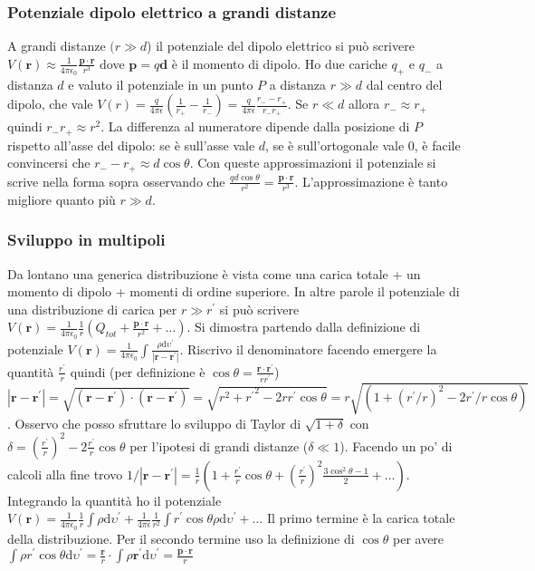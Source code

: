 \documentclass[11pt,a4paper]{article}
\newcommand{\de}{\mathrm d}
\begin{document}
\subsubsection{Potenziale dipolo elettrico a grandi distanze}
A grandi distanze $(r \gg d$) il potenziale del dipolo elettrico si può scrivere $V(\mathbf r) \approx \frac1{4\pi\epsilon_0} \frac{\mathbf p \cdot \mathbf r}{r^3}$ dove $\mathbf p = q \mathbf d$ è il momento di dipolo. Ho due cariche $q_+$ e $q_-$ a distanza $d$ e valuto il potenziale in un punto $P$ a distanza $r\gg d$ dal centro del dipolo, che vale $V(r)=\frac{q}{4\pi\epsilon} (\frac1{r_+}-\frac1{r_-}) = \frac{q}{4\pi\epsilon} \frac{r_- - r_+}{r_- r_+}$. Se $r \ll d$ allora $r_- \approx r_+$ quindi $r_- r_+ \approx r^2$. La differenza al numeratore dipende dalla posizione di $P$ rispetto all'asse del dipolo: se è sull'asse vale $d$, se è sull'ortogonale vale $0$, è facile convincersi che $r_- - r_+ \approx d \cos\theta$. Con queste approssimazioni il potenziale si scrive nella forma sopra osservando che $\frac{q d \cos\theta}{r^2} = \frac{\mathbf p \cdot \mathbf r}{r^3}$. L'approssimazione è tanto migliore quanto più $r\gg d$.

\subsubsection{Sviluppo in multipoli}
Da lontano una generica distribuzione è vista come una carica totale + un momento di dipolo + momenti di ordine superiore. In altre parole il potenziale di una distribuzione di carica per $r \gg r^\prime$ si può scrivere $V(\mathbf r) = \frac1{4\pi\epsilon_0} \frac 1r (Q_{tot} + \frac{\mathbf  p \cdot \mathbf  r}{r^2} + \ldots)$. Si dimostra partendo dalla definizione di potenziale $V(\mathbf r) = \frac1{4\pi\epsilon_0} \int \frac{\rho \de\upsilon^\prime}{|\mathbf r - \mathbf r^\prime|}$. Riscrivo il denominatore facendo emergere la quantità $\frac {r^\prime}r$ quindi (per definizione è $\cos\theta = \frac{\mathbf r \cdot \mathbf r^\prime}{r r^\prime}$) $|\mathbf r - \mathbf r^\prime| = \sqrt{(\mathbf r - \mathbf r^\prime)\cdot(\mathbf r - \mathbf r^\prime)} = \sqrt{r^2 + {r^\prime}^2 - 2rr^\prime\cos\theta} = r\sqrt{(1 + (r^\prime/r)^2 - 2r^\prime/r\cos\theta)}$. Osservo che posso sfruttare lo sviluppo di Taylor di $\sqrt{1+\delta}$ con $\delta = (\frac{r^\prime}r)^2 - 2\frac{r^\prime}r\cos\theta$ per l'ipotesi di grandi distanze ($\delta \ll 1$). Facendo un po' di calcoli alla fine trovo $1/|\mathbf r - \mathbf r^\prime| = \frac1r (1 + \frac{r^\prime}r \cos\theta + (\frac{r^\prime}r)^2 \frac{3\cos^2\theta-1}2 + \ldots)$. Integrando la quantità ho il potenziale $V(\mathbf r) = \frac1{4\pi\epsilon_0} \frac1r \int \rho \de\upsilon^\prime + \frac1{4\pi\epsilon} \frac1{r^2} \int r^\prime \cos\theta \rho \de\upsilon^\prime + \ldots$ Il primo termine è la carica totale della distribuzione. Per il secondo termine uso la definizione di $\cos\theta$ per avere $\int \rho r^\prime \cos\theta \de\upsilon^\prime = \frac{\mathbf r}r \cdot \int \rho \mathbf r^\prime \de\upsilon^\prime = \frac{\mathbf p \cdot \mathbf r}r$
\end{document}
